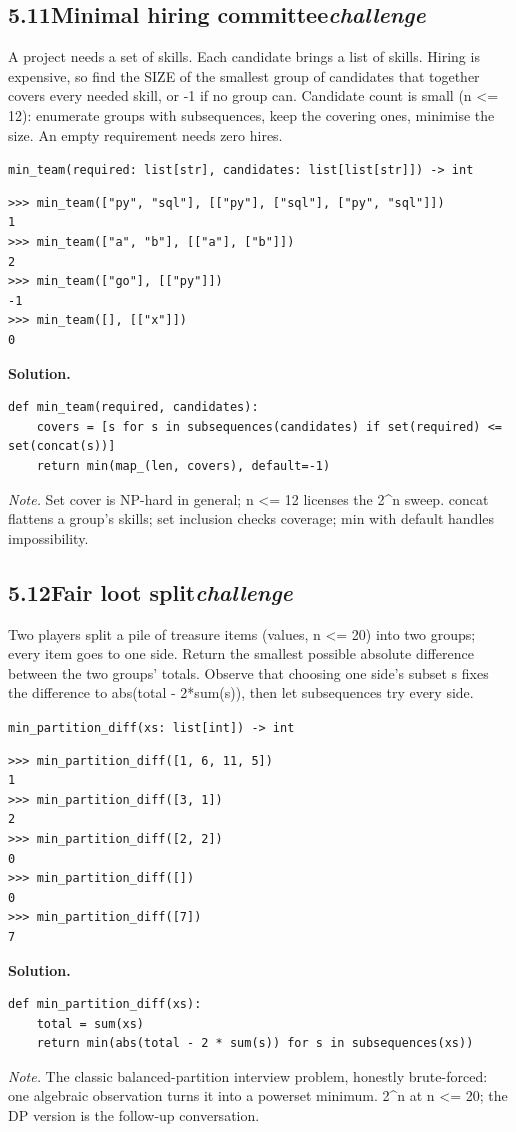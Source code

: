 \documentclass[10pt,letterpaper]{book}
\begin{document}
\subsection*{5.11\quad Minimal hiring committee\hfill\textnormal{\textit{challenge}}}
A project needs a set of skills. Each candidate brings a list of skills. Hiring is expensive, so find the SIZE of the smallest group of candidates that together covers every needed skill, or -1 if no group can. Candidate count is small (n <= 12): enumerate groups with subsequences, keep the covering ones, minimise the size. An empty requirement needs zero hires.

\noindent\texttt{min\_team(required: list[str], candidates: list[list[str]]) -> int}
\begin{lstlisting}[style=ex]
>>> min_team(["py", "sql"], [["py"], ["sql"], ["py", "sql"]])
1
>>> min_team(["a", "b"], [["a"], ["b"]])
2
>>> min_team(["go"], [["py"]])
-1
>>> min_team([], [["x"]])
0
\end{lstlisting}
\noindent\textbf{Solution.}
\begin{lstlisting}[style=code]
def min_team(required, candidates):
    covers = [s for s in subsequences(candidates) if set(required) <= set(concat(s))]
    return min(map_(len, covers), default=-1)
\end{lstlisting}
\noindent\textit{Note.} Set cover is NP-hard in general; n <= 12 licenses the 2\^{}n sweep. concat flattens a group's skills; set inclusion checks coverage; min with default handles impossibility.

\subsection*{5.12\quad Fair loot split\hfill\textnormal{\textit{challenge}}}
Two players split a pile of treasure items (values, n <= 20) into two groups; every item goes to one side. Return the smallest possible absolute difference between the two groups' totals. Observe that choosing one side's subset s fixes the difference to abs(total - 2*sum(s)), then let subsequences try every side.

\noindent\texttt{min\_partition\_diff(xs: list[int]) -> int}
\begin{lstlisting}[style=ex]
>>> min_partition_diff([1, 6, 11, 5])
1
>>> min_partition_diff([3, 1])
2
>>> min_partition_diff([2, 2])
0
>>> min_partition_diff([])
0
>>> min_partition_diff([7])
7
\end{lstlisting}
\noindent\textbf{Solution.}
\begin{lstlisting}[style=code]
def min_partition_diff(xs):
    total = sum(xs)
    return min(abs(total - 2 * sum(s)) for s in subsequences(xs))
\end{lstlisting}
\noindent\textit{Note.} The classic balanced-partition interview problem, honestly brute-forced: one algebraic observation turns it into a powerset minimum. 2\^{}n at n <= 20; the DP version is the follow-up conversation.
\end{document}
